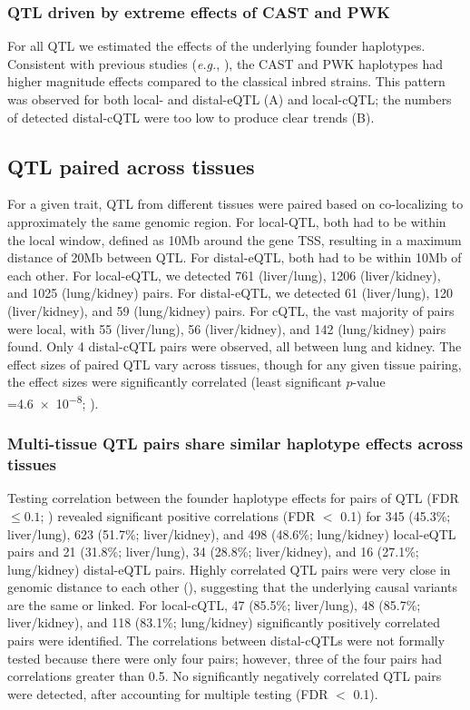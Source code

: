 \documentclass[10pt,letterpaper]{article}
\newcommand{\eg}{\emph{e.g.}\xspace}
\begin{document}
\subsubsection*{QTL driven by extreme effects of CAST and PWK}
For all QTL we estimated the effects of the underlying founder haplotypes. Consistent with previous studies (\eg, \cite{Aylor2011}), the CAST and PWK haplotypes had higher magnitude effects compared to the classical inbred strains. This pattern was observed for both local- and distal-eQTL (A) and local-cQTL; the numbers of detected distal-cQTL were too low to produce clear trends (B).

\subsection*{QTL paired across tissues}

For a given trait, QTL from different tissues were paired based on co-localizing to approximately the same genomic region. For local-QTL, both had to be within the local window, defined as 10Mb around the gene TSS, resulting in a maximum distance of 20Mb between QTL. For distal-eQTL, both had to be within 10Mb of each other. 
For local-eQTL, we detected 761 (liver/lung), 1206 (liver/kidney), and 1025 (lung/kidney) pairs. For distal-eQTL, we detected 61 (liver/lung), 120 (liver/kidney), and 59 (lung/kidney) pairs. For cQTL, the vast majority of pairs were local, with 55 (liver/lung), 56 (liver/kidney), and 142 (lung/kidney) pairs found. Only 4 distal-cQTL pairs were observed, all between lung and kidney. The effect sizes of paired QTL vary across tissues, though for any given tissue pairing, the effect sizes were significantly correlated (least significant $p$-value =\num{4.6e-8}; ).

\subsubsection*{Multi-tissue QTL pairs share similar haplotype effects across tissues}
Testing correlation between the founder haplotype effects for pairs of QTL (FDR $\le 0.1$; ) revealed significant positive correlations (FDR $<$ 0.1) for 345 (45.3\%; liver/lung), 623 (51.7\%; liver/kidney), and 498 (48.6\%; lung/kidney) local-eQTL pairs and 21 (31.8\%; liver/lung), 34 (28.8\%; liver/kidney), and 16 (27.1\%; lung/kidney) distal-eQTL pairs. Highly correlated QTL pairs were very close in genomic distance to each other (), suggesting that the underlying causal variants are the same or linked. For local-cQTL, 47 (85.5\%; liver/lung), 48 (85.7\%; liver/kidney), and 118 (83.1\%; lung/kidney) significantly positively correlated pairs were identified. The correlations between distal-cQTLs were not formally tested because there were only four pairs; however, three of the four pairs had correlations greater than 0.5. No significantly negatively correlated QTL pairs were detected, after accounting for multiple testing (FDR $<$ 0.1).
\end{document}
